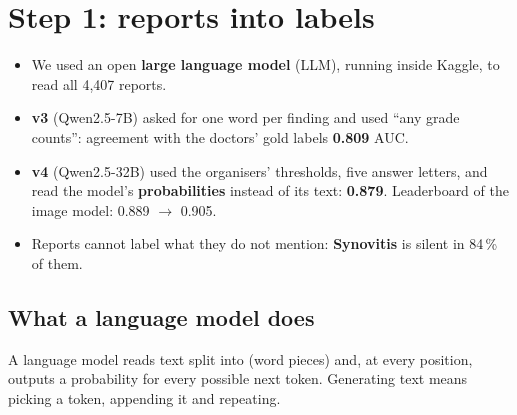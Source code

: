 \chapter{Step 1: reports into labels}
\label{ch:labels}

\begin{tldr}
\begin{itemize}
\item We used an open \textbf{large language model} (LLM), running inside Kaggle, to read all 4,407 reports.
\item \textbf{v3} (Qwen2.5-7B) asked for one word per finding and used ``any grade counts'': agreement with the
      doctors' gold labels \textbf{0.809} AUC.
\item \textbf{v4} (Qwen2.5-32B) used the organisers' thresholds, five answer letters, and read the model's
      \textbf{probabilities} instead of its text: \textbf{0.879}. Leaderboard of the image model: 0.889 $\rightarrow$ 0.905.
\item Reports cannot label what they do not mention: \textbf{Synovitis} is silent in 84\,\% of them.
\end{itemize}
\end{tldr}

\section{What a language model does}

A language model reads text split into  (word pieces) and, at every position, outputs a probability
for every possible next token. Generating text means picking a token, appending it and repeating.

